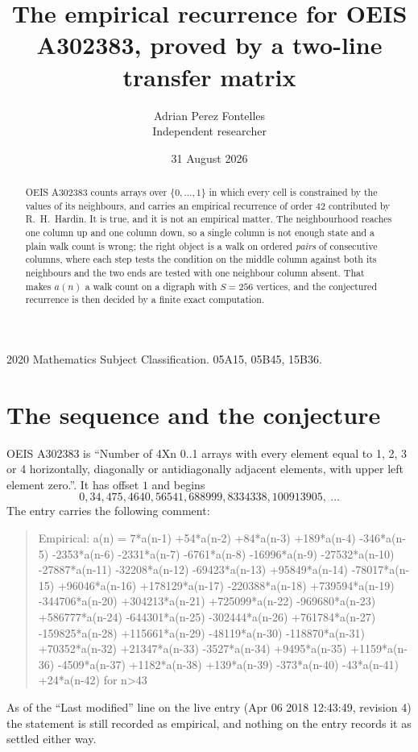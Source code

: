 \documentclass[11pt,a4paper]{article}
\title{The empirical recurrence for OEIS A302383, proved by a two-line transfer matrix}
\author{Adrian Perez Fontelles\\ \small Independent researcher}
\date{31 August 2026}
\theoremstyle{plain}
\theoremstyle{definition}
\begin{document}
\maketitle

\begin{abstract}
OEIS A302383 counts arrays over $\{0,\dots,1\}$ in which every cell is constrained by the
values of its neighbours, and carries an empirical recurrence of order $42$ contributed
by R.~H.~Hardin. It is true, and it is not an empirical matter. The neighbourhood reaches one
column up and one column down, so a single column is not enough state and a plain walk count
is wrong; the right object is a walk on ordered \emph{pairs} of consecutive columns, where
each step tests the condition on the middle column against both its neighbours and the two
ends are tested with one neighbour column absent. That makes $a(n)$ a walk count on a digraph
with $S=256$ vertices, and the conjectured recurrence is then decided by a finite exact
computation.
\end{abstract}

\noindent\small 2020 Mathematics Subject Classification. 05A15, 05B45, 15B36.\normalsize

\section{The sequence and the conjecture}

OEIS A302383 is ``Number of 4Xn 0..1 arrays with every element equal to 1, 2, 3 or 4 horizontally, diagonally or antidiagonally adjacent elements, with upper left element zero.''. It has offset $1$ and begins
\[
0, 34, 475, 4640, 56541, 688999, 8334338, 100913905,\ \dots
\]
The entry carries the following comment:
\begin{quote}\small
Empirical: a(n) = 7*a(n-1) +54*a(n-2) +84*a(n-3) +189*a(n-4) -346*a(n-5) -2353*a(n-6) -2331*a(n-7) -6761*a(n-8) -16996*a(n-9) -27532*a(n-10) -27887*a(n-11) -32208*a(n-12) -69423*a(n-13) +95849*a(n-14) -78017*a(n-15) +96046*a(n-16) +178129*a(n-17) -220388*a(n-18) +739594*a(n-19) -344706*a(n-20) +304213*a(n-21) +725099*a(n-22) -969680*a(n-23) +586777*a(n-24) -644301*a(n-25) -302444*a(n-26) +761784*a(n-27) -159825*a(n-28) +115661*a(n-29) -48119*a(n-30) -118870*a(n-31) +70352*a(n-32) +21347*a(n-33) -3527*a(n-34) +9495*a(n-35) +1159*a(n-36) -4509*a(n-37) +1182*a(n-38) +139*a(n-39) -373*a(n-40) -43*a(n-41) +24*a(n-42) for n>43
\end{quote}
As of the ``Last modified'' line on the live entry (Apr 06 2018 12:43:49, revision 4) the statement is
still recorded as empirical, and nothing on the entry records it as settled either way.
\end{document}
